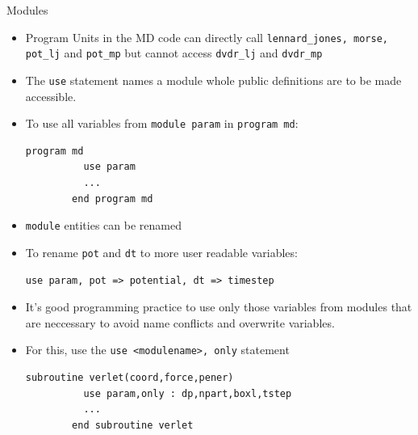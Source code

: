 \documentclass[c,mathserif,compress,xcolor=svgnames]{beamer}
\newcommand{\lstfortran}[1]{\lstinline[language={[90]Fortran},basicstyle=\footnotesize\ttfamily]|#1|}
\begin{document}
\begin{frame}{Modules}
\begin{itemize}
\begin{lstlisting}[language={[90]Fortran},basicstyle=\fontsize{5}{6}\selectfont\ttfamily,mathescape]
contains
  $\cdots$
end module potential
      \end{lstlisting}
    \item Program Units in the MD code can directly call \lstfortran{lennard_jones, morse, pot_lj} and \lstfortran{pot_mp} but cannot access \lstfortran{dvdr_lj} and \lstfortran{dvdr_mp}
    \end{itemize}
  \framebreak
    \begin{itemize}
      \item The \lstfortran{use} statement names a module whole public definitions are to be made accessible.
      \item[] To use all variables from \lstfortran{module param} in \lstfortran{program md}:
        \begin{lstlisting}[language={[90]Fortran},basicstyle=\fontsize{5}{6}\selectfont\ttfamily,mathescape]
        program md
          use param
          ...
        end program md
        \end{lstlisting}
      \item \lstfortran{module} entities can be renamed
      \item[] To rename \lstfortran{pot} and \lstfortran{dt} to more user readable variables:
        \begin{lstlisting}[language={[90]Fortran},basicstyle=\fontsize{5}{6}\selectfont\ttfamily,mathescape]
        use param, pot => potential, dt => timestep
        \end{lstlisting}
      \item It's good programming practice to use only those variables from modules that are neccessary to avoid name conflicts and overwrite variables.
      \item For this, use the \lstfortran{use <modulename>, only} statement
        \begin{lstlisting}[language={[90]Fortran},basicstyle=\fontsize{5}{6}\selectfont\ttfamily,mathescape]
        subroutine verlet(coord,force,pener)
          use param,only : dp,npart,boxl,tstep
          ...
        end subroutine verlet
            \end{lstlisting}
    \end{itemize}
\end{frame}
\end{document}
